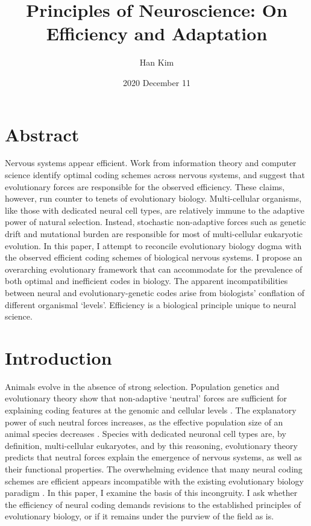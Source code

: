 \documentclass{article}
\begin{document}
\title{Principles of Neuroscience: On Efficiency and Adaptation}
\author{Han Kim}
\date{2020 December 11}

\maketitle

\section*{Abstract}

Nervous systems appear efficient. Work from information theory and computer science identify optimal coding schemes across nervous systems, and suggest that evolutionary forces are responsible for the observed efficiency. These claims, however, run counter to tenets of evolutionary biology. Multi-cellular organisms, like those with dedicated neural cell types, are relatively immune to the adaptive power of natural selection. Instead, stochastic non-adaptive forces such as genetic drift and mutational burden are responsible for most of multi-cellular eukaryotic evolution. In this paper, I attempt to reconcile evolutionary biology dogma with the observed efficient coding schemes of biological nervous systems. I propose an overarching evolutionary framework that can accommodate for the prevalence of both optimal and inefficient codes in biology. The apparent incompatibilities between neural and evolutionary-genetic codes arise from biologists' conflation of different organismal `levels'.  Efficiency is a biological principle unique to neural science. 

\section{Introduction}

Animals evolve in the absence of strong selection. Population genetics and evolutionary theory show that non-adaptive `neutral' forces are sufficient for explaining coding features at the genomic and cellular levels \cite{Lynch_2007, lynch2007origins}. The explanatory power of such neutral forces increases, as the effective population size of an animal species decreases \cite{Lynch_Conery_2003, kimura1983neutral}. Species with dedicated neuronal cell types are, by definition, multi-cellular eukaryotes, and by this reasoning, evolutionary theory predicts that neutral forces explain the emergence of nervous systems, as well as their functional properties. The overwhelming evidence that many neural coding schemes are efficient appears incompatible with the existing evolutionary biology paradigm \cite{Barlow_2012, Pitkow_Meister_2012, Machens_Gollisch_Kolesnikova_Herz_2005, Mimica_Dunn_Tombaz_Bojja_Whitlock_2018}. In this paper, I examine the basis of this incongruity. I ask whether the efficiency of neural coding demands revisions to the established principles of evolutionary biology, or if it remains under the purview of the field as is.
\end{document}
